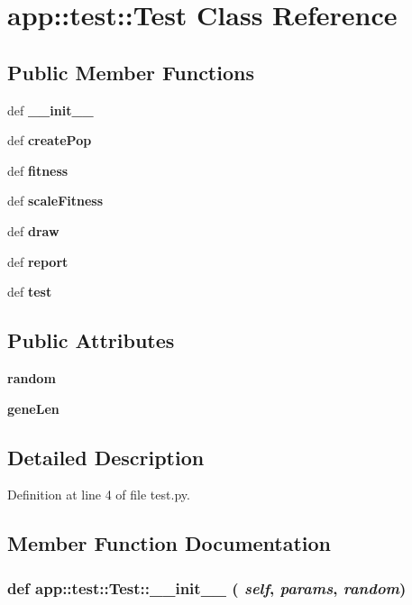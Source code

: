 \section{app::test::Test Class Reference}
\label{classapp_1_1test_1_1Test}
\subsection*{Public Member Functions}
\begin{CompactItemize}
\item 
def {\bf \_\-\_\-init\_\-\_\-}
\item 
def {\bf createPop}
\item 
def {\bf fitness}
\item 
def {\bf scaleFitness}
\item 
def {\bf draw}
\item 
def {\bf report}
\item 
def {\bf test}
\end{CompactItemize}
\subsection*{Public Attributes}
\begin{CompactItemize}
\item 
{\bf random}
\item 
{\bf geneLen}
\end{CompactItemize}


\subsection{Detailed Description}


Definition at line 4 of file test.py.

\subsection{Member Function Documentation}
\subsubsection{\setlength{\rightskip}{0pt plus 5cm}def app::test::Test::\_\-\_\-init\_\-\_\- ( {\em self},  {\em params},  {\em random})}\label{classapp_1_1test_1_1Test_d4bd94673507f32fd88d8b821b874ca5}





